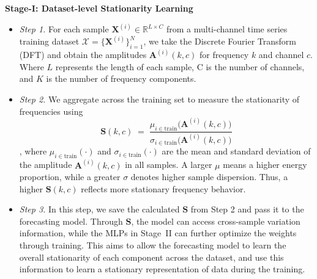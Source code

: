 \documentclass[sigconf,anonymous,review]{acmart}
\begin{document}
\noindent\textbf{Stage-I: Dataset-level Stationarity Learning}
\begin{itemize}[leftmargin=1.5em]
    \item \emph{Step 1.} For each sample $\mathbf{X}^{(i)} \in \mathbb{R}^{L \times C}$ from a multi-channel time series training dataset $\mathcal{X} = \{\mathbf{X}^{(i)}\}_{i=1}^N$, we take the Discrete Fourier Transform (DFT) and obtain the amplitudes $\mathbf{A}^{(i)}(k,c)$ for frequency $k$ and channel $c$. Where $L$ represents the length of each sample, C is the number of channels, and $K$ is the number of frequency components.
    \item \emph{Step 2.} We aggregate across the training set to measure the stationarity of frequencies using
    $$\mathbf{S}(k,c)\;=\;\frac{\mu_{i\in\text{train}}\!\big(\mathbf{A}^{(i)}(k,c)\big)}{\sigma_{i\in\text{train}}\!\big(\mathbf{A}^{(i)}(k,c)\big)}$$,
    where $\mu_{i\in\mathrm{train}}(\cdot)$ and $\sigma_{i\in\mathrm{train}}(\cdot)$ are the mean and standard deviation of the amplitude $\mathbf{A}^{(i)}(k,c)$ in all samples. 
    A larger $\mu$ means a higher energy proportion, while a greater $\sigma$ denotes higher sample dispersion. 
    Thus, a higher $\mathbf{S}(k,c)$ reflects more stationary frequency behavior.
    \item \emph{Step 3.} In this step, we save the calculated $\mathbf{S}$ from Step 2 and pass it to the forecasting model.
    Through $\mathbf{S}$, the model can access cross-sample variation information, while the MLPs in Stage~II can further optimize the weights through training.
    This aims to allow the forecasting model to learn the overall stationarity of each component across the dataset, 
    and use this information to learn a stationary representation of data during the training.
\end{itemize}
\end{document}
